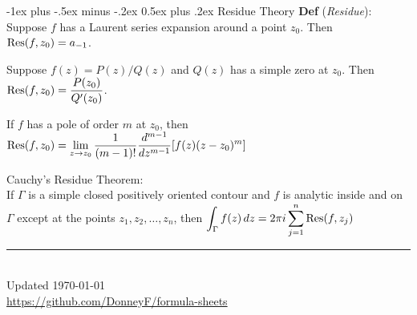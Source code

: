 \documentclass[12pt,landscape]{article}
\makeatletter
\renewcommand{\section}{\@startsection{section}{1}{0mm}%
                                {-1ex plus -.5ex minus -.2ex}%
                                {0.5ex plus .2ex}%
                                {\normalfont\normalsize\bfseries}}
\newcommand{\tab}{\hspace{.02\textwidth}}
\newcommand{\ds}{\displaystyle}
\newcommand{\defn}[1]{\textbf{Def} (\emph{#1})}
\theoremstyle{definition}
\makeatother
\begin{document}
\begin{multicols}{3}
\section{Residue Theory}
\defn{Residue}: Suppose $f$ has a Laurent series expansion around a point $z_0$. Then $\Res(f, z_0) = a_{-1}$.

\begin{theorem}
	Suppose $f(z) = P(z)/Q(z)$ and $Q(z)$ has a simple zero at $z_0$. Then $\ds \Res(f, z_0)= \frac{P(z_0)}{Q'(z_0)}$.
\end{theorem}
\begin{theorem}
	If $f$ has a pole of order $m$ at $z_0$, then $\ds \Res(f, z_0) = \lim_{ z\rightarrow z_0}\frac{1}{(m-1)!} \frac{d^{m-1}}{dz^{m-1}}[f(z)(z-z_0)^m]$
\end{theorem}

Cauchy's Residue Theorem:\\
\tab If $\Gamma$ is a simple closed positively oriented contour and $f$ is analytic inside and on $\Gamma$ except at the points $z_1, z_2, \ldots , z_n$, then $\ds \int_{\Gamma}f(z)\,dz = 2\pi i \sum_{j=1}^{n}\Res(f, z_j)$

\rule{0.3\linewidth}{0.25pt}
\scriptsize\\
Updated \today\\
\href{https://github.com/DonneyF/formula-sheets}{https://github.com/DonneyF/formula-sheets}
\end{multicols}
\end{document}
